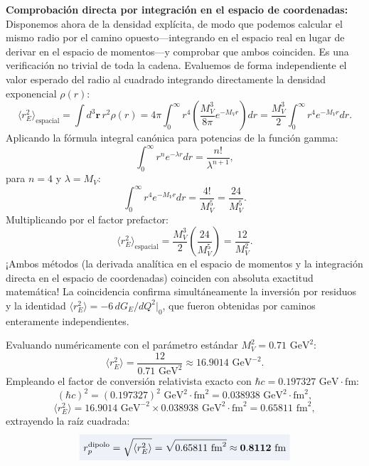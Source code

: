 \documentclass[10pt,a4paper]{article}
\newcommand{\dest}[1]{{\setlength{\fboxsep}{4pt}\colorbox{colordest}{$\displaystyle #1$}}}
\begin{document}
\textbf{Comprobación directa por integración en el espacio de coordenadas:}\\
Disponemos ahora de la densidad explícita, de modo que podemos calcular el mismo radio por el camino opuesto---integrando en el espacio real en lugar de derivar en el espacio de momentos---y comprobar que ambos coinciden. Es una verificación no trivial de toda la cadena. Evaluemos de forma independiente el valor esperado del radio al cuadrado integrando directamente la densidad exponencial $\rho(r)$:
\begin{equation}
\langle r_E^2 \rangle_{\text{espacial}} = \int d^3\mathbf{r} \, r^2 \rho(r) = 4\pi \int_0^\infty r^4 \left( \frac{M_V^3}{8\pi} e^{-M_V r} \right) dr = \frac{M_V^3}{2} \int_0^\infty r^4 e^{-M_V r} dr.
\end{equation}
Aplicando la fórmula integral canónica para potencias de la función gamma:
\begin{equation}
\int_0^\infty r^n e^{-\lambda r} dr = \frac{n!}{\lambda^{n+1}},
\end{equation}
para $n = 4$ y $\lambda = M_V$:
\begin{equation}
\int_0^\infty r^4 e^{-M_V r} dr = \frac{4!}{M_V^5} = \frac{24}{M_V^5}.
\end{equation}
Multiplicando por el factor prefactor:
\begin{equation}
\langle r_E^2 \rangle_{\text{espacial}} = \frac{M_V^3}{2} \left( \frac{24}{M_V^5} \right) = \frac{12}{M_V^2}.
\end{equation}
¡Ambos métodos (la derivada analítica en el espacio de momentos y la integración directa en el espacio de coordenadas) coinciden con absoluta exactitud matemática! La coincidencia confirma simultáneamente la inversión por residuos y la identidad $\langle r_E^2\rangle = -6\,dG_E/dQ^2|_0$, que fueron obtenidas por caminos enteramente independientes.

Evaluando numéricamente con el parámetro estándar $M_V^2 = 0.71\text{ GeV}^2$:
\begin{equation}
\langle r_E^2 \rangle = \frac{12}{0.71\text{ GeV}^2} \approx 16.9014\text{ GeV}^{-2}.
\end{equation}
Empleando el factor de conversión relativista exacto con $\hbar c = 0.197327\text{ GeV}\cdot\text{fm}$:
\begin{equation}
(\hbar c)^2 = (0.197327)^2\text{ GeV}^2\cdot\text{fm}^2 = 0.038938\text{ GeV}^2\cdot\text{fm}^2,
\end{equation}
\begin{equation}
\langle r_E^2 \rangle = 16.9014\text{ GeV}^{-2} \times 0.038938\text{ GeV}^2\cdot\text{fm}^2 = 0.65811\text{ fm}^2,
\end{equation}
extrayendo la raíz cuadrada:
\begin{equation}
\dest{r_p^{\text{dipolo}} = \sqrt{\langle r_E^2 \rangle} = \sqrt{0.65811\text{ fm}^2} \approx \mathbf{0.8112\text{ fm}}}
\end{equation}
\end{document}
